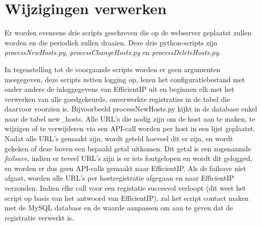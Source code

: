 \section{Wijzigingen verwerken}
\label{wijzigingen-verwerken}
Er worden eveneens drie scripts geschreven die op de webserver geplaatst zullen worden en die periodiek zullen draaien.
Deze drie python-scripts zijn \textit{processNewHosts.py}, \textit{processChangeHosts.py} en \textit{processDeleteHosts.py}.

In tegenstelling tot de voorgaande scripts worden er geen argumenten meegegeven, deze scripts zetten logging op, lezen het configuratiebestand met onder andere de inloggegevens van EfficientIP uit en beginnen elk met het verwerken van alle goedgekeurde, onverwerkte registraties in de tabel die daarvoor voorzien is. Bijvoorbeeld processNewHosts.py kijkt in de database enkel naar de tabel new\_hosts.
Alle URL's die nodig zijn om de host aan te maken, te wijzigen of te verwijderen via een API-call worden per host in een lijst geplaatst.
Nadat alle URL's gemaakt zijn, wordt geteld hoeveel dit er zijn, en wordt gekeken of deze boven een bepaald getal uitkomen.
Dit getal is een zogenaamde \textit{failsave}, indien er teveel URL's zijn is er iets foutgelopen en wordt dit gelogged, en worden er dus geen API-calls gemaakt naar EfficientIP.
Als de failsave niet afgaat, worden alle URL's per hostregistratie afgegaan en naar EfficientIP verzonden. 
Indien elke call voor een registatie succesvol verloopt (dit weet het script op basis van het antwoord van EfficientIP), zal het script contact maken met de MySQL database en de waarde aanpassen om aan te geven dat de registratie verwerkt is.




